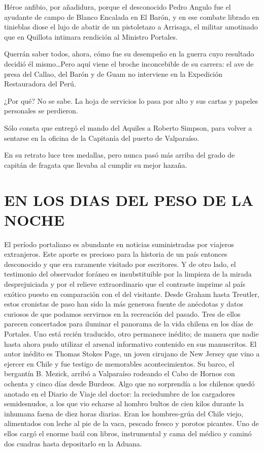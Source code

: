 \documentclass[10pt,twoside,openright]{memoir}
\begin{document}
Héroe anfibio, por añadidura, porque el desconocido Pedro Angulo fue el
ayudante de campo de Blanco Encalada en El Barón, y en ese combate
librado en tinieblas diose el lujo de abatir de un pistoletazo a
Arrisaga, el militar amotinado que en Quillota intimara rendición al
Ministro Portales.

Querrán saber todos, ahora, cómo fue su desempeño en la guerra cuyo
resultado decidió él mismo\ldots Pero aquí viene el broche inconcebible de
su carrera: el ave de presa del Callao, del Barón y de Guam no
interviene en la Expedición Restauradora del Perú.

¿Por qué? No se sabe. La hoja de servicios lo pasa por alto y sus
cartas y papeles personales se perdieron.

Sólo consta que entregó el mando del Aquiles a Roberto Simpson, para
volver a sentarse en la oficina de la Capitanía del puerto de
Valparaíso.

En su retrato luce tres medallas, pero nunca pasó más arriba del grado
de capitán de fragata que llevaba al cumplir su mejor hazaña.

\chapter{EN LOS DIAS DEL PESO DE LA NOCHE}

El período portaliano es abundante en noticias suministradas por
viajeros extranjeros. Este aporte es precioso para la historia de un
país entonces desconocido y que era raramente visitado por escritores. Y
de otro lado, el testimonio del observador foráneo es insubstituible por
la limpieza de la mirada desprejuiciada y por el relieve extraordinario
que el contraste imprime al país exótico puesto en comparación con el
del visitante. Desde Graham hasta Treutler, estos cronistas de paso han
sido la más generosa fuente de anécdotas y datos curiosos de que podamos
servirnos en la recreación del pasado. Tres de ellos parecen concertados
para iluminar el panorama de la vida chilena en los días de Portales.
Uno está recién traducido, otro permanece inédito; de manera que nadie
hasta ahora pudo utilizar el arsenal informativo contenido en sus
manuscritos. El autor inédito es Thomas Stokes Page, un joven cirujano
de New Jersey que vino a ejercer en Chile y fue testigo de memorables
acontecimientos. Su barco, el bergantín B. Mezick, arribó a Valparaíso
rodeando el Cabo de Hornos con ochenta y cinco días desde Burdeos. Algo
que no sorprendía a los chilenos quedó anotado en el Diario de Viaje del
doctor: la reciedumbre de los cargadores semidesnudos, a los que vio
echarse al hombro bultos de cien kilos durante la inhumana faena de diez
horas diarias. Eran los hombres-grúa del Chile viejo, alimentados con
leche al pie de la vaca, pescado fresco y porotos picantes. Uno de ellos
cargó el enorme baúl con libros, instrumental y cama del médico y caminó
dos cuadras hasta depositarlo en la Aduana.
\end{document}
